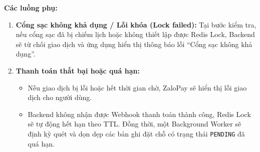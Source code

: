 \textbf{Các luồng phụ:}
\begin{enumerate}[font=\bfseries]
\item \textbf{Cổng sạc không khả dụng / Lỗi khóa (Lock failed):} Tại bước kiểm tra, nếu cổng sạc đã bị chiếm lịch hoặc không thiết lập được Redis Lock, Backend sẽ từ chối giao dịch và ứng dụng hiển thị thông báo lỗi ``Cổng sạc không khả dụng''.
\item \textbf{Thanh toán thất bại hoặc quá hạn:}
\begin{itemize}
  \item Nếu giao dịch bị lỗi hoặc hết thời gian chờ, ZaloPay sẽ hiển thị lỗi giao dịch cho người dùng.
  \item Backend không nhận được Webhook thanh toán thành công, Redis Lock sẽ tự động hết hạn theo TTL. Đồng thời, một Background Worker sẽ định kỳ quét và dọn dẹp các bản ghi đặt chỗ có trạng thái \texttt{PENDING} đã quá hạn.
\end{itemize}
\end{enumerate}

